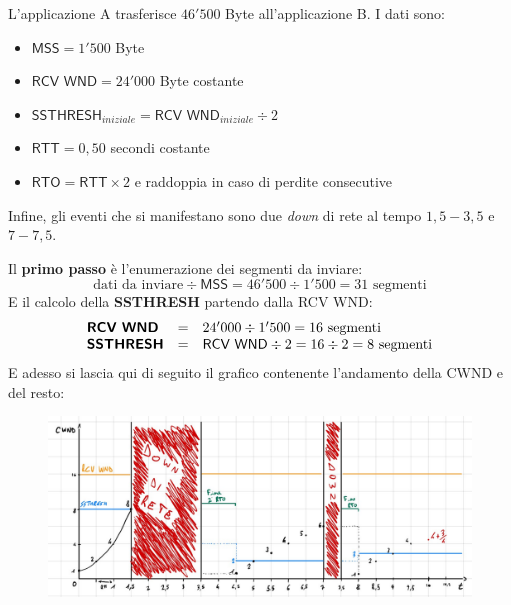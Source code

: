 \documentclass[a4paper]{article}
\begin{document}
	L’applicazione A trasferisce $46'500$ Byte all’applicazione B. I dati sono:
	\begin{itemize}
		\item $\textsf{MSS} = 1'500$ Byte
		\item $\textsf{RCV WND} = 24'000$ Byte costante
		\item $\textsf{SSTHRESH}_{iniziale} = \textsf{RCV WND}_{iniziale} \div 2$
		\item $\textsf{RTT} = 0,50$ secondi costante
		\item $\textsf{RTO} = \textsf{RTT} \times 2$ e raddoppia in caso di perdite consecutive
	\end{itemize}
	Infine, gli eventi che si manifestano sono due \emph{down} di rete al tempo $1,5 - 3,5$ e $7 - 7,5$.\newline
	
	\noindent
	Il \textbf{primo passo} è l'enumerazione dei segmenti da inviare:
	\begin{equation*}
		\text{dati da inviare} \div \textsf{MSS} = 46'500 \div 1'500 = 31 \text{ segmenti}
	\end{equation*}
	E il calcolo della \textbf{SSTHRESH} partendo dalla \textsf{RCV WND}:
	\begin{equation*}
		\begin{array}{lll}
			\textbf{\textsf{RCV WND}} 	& = & 24'000 \div 1'500 = 16 \text{ segmenti} \\
			\textbf{\textsf{SSTHRESH}} 	& = & \textsf{RCV WND} \div 2 = 16 \div 2 = 8 \text{ segmenti}
		\end{array}
	\end{equation*}\newpage
	\noindent
	E adesso si lascia qui di seguito il grafico contenente l’andamento della CWND e del resto:
	\begin{figure}[!htp]
		\centering
		\includegraphics[width=\textwidth]{img/ex2_congestione.pdf}
	\end{figure}
\end{document}
